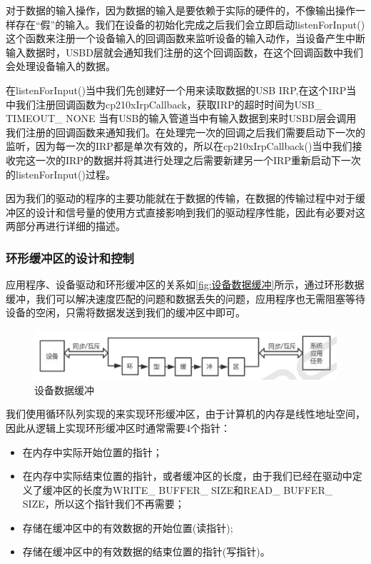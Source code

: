 	对于数据的输入操作，因为数据的输入是要依赖于实际的硬件的，不像输出操作一样存在“假”的输入。我们在设备的初始化完成之后我们会立即启动listenForInput()这个函数来注册一个设备输入的回调函数来监听设备的输入动作，当设备产生中断输入数据时，USBD层就会通知我们注册的这个回调函数，在这个回调函数中我们会处理设备输入的数据。
	
	在listenForInput()当中我们先创建好一个用来读取数据的USB IRP,在这个IRP当中我们注册回调函数为cp210xIrpCallback，获取IRP的超时时间为USB\_ TIMEOUT\_ NONE
	当有USB的输入管道当中有输入数据到来时USBD层会调用我们注册的回调函数来通知我们。在处理完一次的回调之后我们需要启动下一次的监听，因为每一次的IRP都是单次有效的，所以在cp210xIrpCallback()当中我们接收完这一次的IRP的数据并将其进行处理之后需要新建另一个IRP重新启动下一次的listenForInput()过程。


	因为我们的驱动的程序的主要功能就在于数据的传输，在数据的传输过程中对于缓冲区的设计和信号量的使用方式直接影响到我们的驱动程序性能，因此有必要对这两部分再进行详细的描述。
	
\subsubsection{环形缓冲区的设计和控制}
		
  应用程序、设备驱动和环形缓冲区的关系如\autoref{fig:设备数据缓冲}所示，通过环形数据缓冲，我们可以解决速度匹配的问题和数据丢失的问题，应用程序也无需阻塞等待设备的空闲，只需将数据发送到我们的缓冲区中即可。
  
\begin{figure}[!h]
\centering
\includegraphics[width=.9\textwidth]{./graphics/Dev-Data-Buf.pdf}
\caption{设备数据缓冲}\label{fig:设备数据缓冲}
\end{figure}

 
	我们使用循环队列实现的来实现环形缓冲区，由于计算机的内存是线性地址空间，因此从逻辑上实现环形缓冲区时通常需要4个指针：
	 \begin{itemize}
	 \item 在内存中实际开始位置的指针；
	 \item 在内存中实际结束位置的指针，或者缓冲区的长度，由于我们已经在驱动中定义了缓冲区的长度为WRITE\_ BUFFER\_ SIZE和READ\_ BUFFER\_ SIZE，所以这个指针我们不再需要；
	 \item 存储在缓冲区中的有效数据的开始位置(读指针);
	 \item 存储在缓冲区中的有效数据的结束位置的指针(写指针)。
	 \end{itemize}
	
